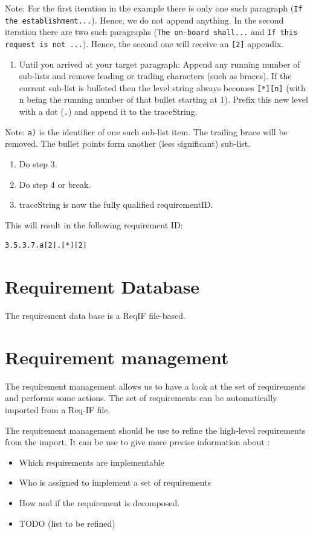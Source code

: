 \documentclass[11pt]{template/openetcs_report}
\begin{document}
Note: For the first iteration in the example there is only one such paragraph
(\texttt{If the establishment...}). Hence, we do not append anything. In the
second iteration there are two such paragraphs (\texttt{The on-board shall...} and
\texttt{If this request is not ...}). Hence, the second one will receive an
\texttt{[2]} appendix.
\begin{enumerate}
\item Until you arrived at your target paragraph: Append any running number of
sub-lists and remove leading or trailing characters (such as braces). If the
current sub-list is bulleted then the level string always becomes
\verb+[*][n]+ (with n being the running number of that bullet starting at
1). Prefix this new level with a dot (\verb+.+) and append it to the
traceString.
\end{enumerate}

Note: \verb+a)+ is the identifier of one such sub-list item. The trailing brace
will be removed. The bullet points form another (less significant) sub-list.
\begin{enumerate}
\item Do step 3.
\item Do step 4 or break.
\item traceString is now the fully qualified requirementID.
\end{enumerate}

This will result in the following requirement ID:
\begin{verbatim}
3.5.3.7.a[2].[*][2]
\end{verbatim}

\section{Requirement Database}
\label{sec-3}
The requirement data base is a ReqIF file-based.

\section{Requirement management}
\label{sec-4}
The requirement management allows us to have a look at the set of requirements
and performs some actions.
The set of requirements can be automatically imported from a Req-IF file.

The requirement management should be use to refine the high-level requirements
from the import. It can be use to give more precise information about :
\begin{itemize}
\item Which requirements are implementable
\item Who is assigned to implement a set of requirements
\item How and if the requirement is decomposed.
\item TODO (list to be refined)
\end{itemize}
\end{document}

